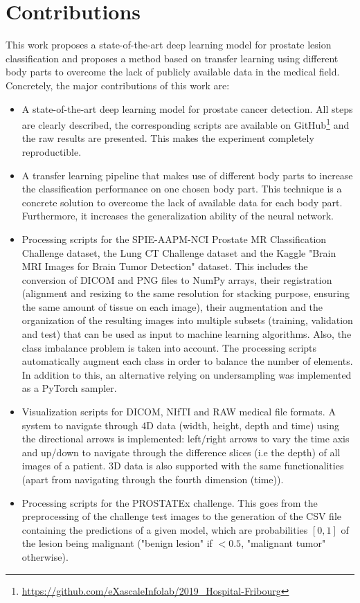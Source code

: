 \section{Contributions}
This work proposes a state-of-the-art deep learning model for prostate lesion classification and proposes a method based on transfer learning using different body parts to overcome the lack of publicly available data in the medical field. Concretely, the major contributions of this work are:
\begin{itemize}
\item A state-of-the-art deep learning model for prostate cancer detection. All steps are clearly described, the corresponding scripts are available on GitHub\footnote{\url{https://github.com/eXascaleInfolab/2019_Hospital-Fribourg}} and the raw results are presented. This makes the experiment completely reproductible. 

\item A transfer learning pipeline that makes use of different body parts to increase the classification performance on one chosen body part. This technique is a concrete solution to overcome the lack of available data for each body part. Furthermore, it increases the generalization ability of the neural network.


\item Processing scripts for the SPIE-AAPM-NCI Prostate MR Classification Challenge dataset, the Lung CT Challenge dataset and the Kaggle "Brain MRI Images for Brain Tumor Detection" dataset. This includes the conversion of DICOM and PNG files to NumPy arrays, their registration (alignment and resizing to the same resolution for stacking purpose, ensuring the same amount of tissue on each image), their augmentation and the organization of the resulting images into multiple subsets (training, validation and test) that can be used as input to machine learning algorithms. Also, the class imbalance problem is taken into account. The processing scripts automatically augment each class in order to balance the number of elements. In addition to this, an alternative relying on undersampling was implemented as a PyTorch sampler.

\item Visualization scripts for DICOM, NIfTI and RAW medical file formats. A system to navigate through 4D data (width, height, depth and time) using the directional arrows is implemented: left/right arrows to vary the time axis and up/down to navigate through the difference slices (i.e the depth) of all images of a patient. 3D data is also supported with the same functionalities (apart from navigating through the fourth dimension (time)). 


\item Processing scripts for the PROSTATEx challenge. This goes from the preprocessing of the challenge test images to the generation of the CSV file containing the predictions of a given model, which are probabilities $[0,1]$ of the lesion being malignant ("benign lesion" if $< 0.5$, "malignant tumor" otherwise).

\end{itemize}
